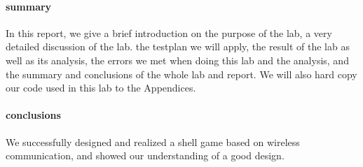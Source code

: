 \paragraph{summary}
In this report, we give a brief introduction on the purpose of the lab, a very detailed
discussion of the lab. the testplan we will apply, the result of the lab as well as its analysis, the
errors we met when doing this lab and the analysis, and the summary and conclusions of the whole
lab and report. We will also hard copy our code used in this lab to the Appendices.
\paragraph{conclusions}
We successfully designed and realized a shell game based on wireless communication, and showed our understanding of a good design.